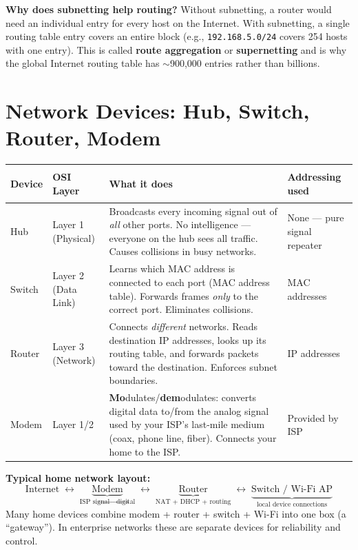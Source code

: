 \documentclass[11pt, letterpaper]{article}
\begin{document}
\textbf{Why does subnetting help routing?} Without subnetting, a router would need an
individual entry for every host on the Internet. With subnetting, a single routing table
entry covers an entire block (e.g., \texttt{192.168.5.0/24} covers 254 hosts with one
entry). This is called \textbf{route aggregation} or \textbf{supernetting} and is why the
global Internet routing table has $\sim$900,000 entries rather than billions.

\section*{Network Devices: Hub, Switch, Router, Modem}

\noindent
{\renewcommand{\arraystretch}{1.7}
\begin{tabularx}{\textwidth}{>{\bfseries\raggedright\arraybackslash}p{2.2cm}
                              >{\centering\arraybackslash}p{1.8cm}
                              >{\raggedright\arraybackslash}X
                              >{\raggedright\arraybackslash}p{3.2cm}}
\toprule
\rowcolor{tableheader}
\textbf{Device} & \textbf{OSI Layer} & \textbf{What it does} & \textbf{Addressing used} \\
\midrule
\rowcolor{rowA} Hub     & Layer 1 (Physical) & Broadcasts every incoming signal out of \emph{all} other ports. No intelligence --- everyone on the hub sees all traffic. Causes collisions in busy networks. & None --- pure signal repeater \\
\rowcolor{rowB} Switch  & Layer 2 (Data Link) & Learns which MAC address is connected to each port (MAC address table). Forwards frames \emph{only} to the correct port. Eliminates collisions. & MAC addresses \\
\rowcolor{rowA} Router  & Layer 3 (Network) & Connects \emph{different} networks. Reads destination IP addresses, looks up its routing table, and forwards packets toward the destination. Enforces subnet boundaries. & IP addresses \\
\rowcolor{rowB} Modem   & Layer 1/2 & \textbf{Mo}dulates/\textbf{dem}odulates: converts digital data to/from the analog signal used by your ISP's last-mile medium (coax, phone line, fiber). Connects your home to the ISP. & Provided by ISP \\
\bottomrule
\end{tabularx}}

\begin{tcolorbox}[colback=partbg, colframe=sectionblue, arc=3pt, boxrule=1pt]
\textbf{Typical home network layout:}
\[
  \text{Internet} \;\longleftrightarrow\;
  \underbrace{\text{Modem}}_{\text{ISP signal} \to \text{digital}} \;\longleftrightarrow\;
  \underbrace{\text{Router}}_{\text{NAT + DHCP + routing}} \;\longleftrightarrow\;
  \underbrace{\text{Switch / Wi-Fi AP}}_{\text{local device connections}}
\]
Many home devices combine modem + router + switch + Wi-Fi into one box (a ``gateway'').
In enterprise networks these are separate devices for reliability and control.
\end{tcolorbox}
\end{document}
